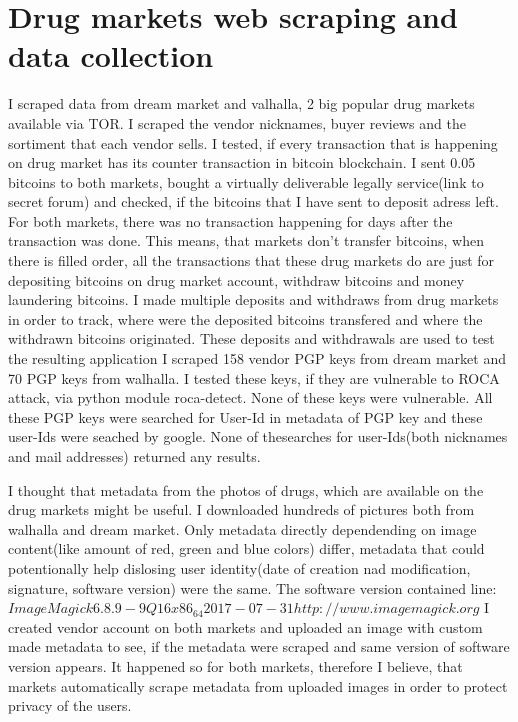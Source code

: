 \documentclass[
  digital, %
  table,   %
  lof,     %
  lot,     %
  oneside
]{fithesis3}
\begin{document}
\section{Drug markets web scraping and data collection}
I scraped data from dream market and valhalla, 2 big popular drug markets available via TOR. I scraped the vendor nicknames, buyer reviews and the sortiment that each vendor sells.
I tested, if every transaction that is happening on drug market has its counter transaction in bitcoin blockchain. I sent 0.05 bitcoins to both markets,
bought a virtually deliverable legally service(link to secret forum) and checked, if the bitcoins that I have sent to deposit adress left.
For both markets, there was no transaction happening for days after the transaction was done. This means, that markets don't transfer bitcoins,
when there is filled order, all the transactions that these drug markets do are just for depositing bitcoins on drug market account,
withdraw bitcoins and money laundering bitcoins.
I made multiple deposits and withdraws from drug markets in order to track, where were the deposited bitcoins transfered and where the withdrawn bitcoins originated.
These deposits and withdrawals are used to test the resulting application
I scraped 158 vendor PGP keys from dream market and 70 PGP keys from walhalla. I tested these keys, if they are vulnerable to ROCA attack, via python module roca-detect. None of these keys were vulnerable.
All these PGP keys were searched for User-Id in metadata of PGP key and these user-Ids were seached by google. None of thesearches for user-Ids(both nicknames and mail addresses) returned any results.

I thought that metadata from the photos of drugs, which are available on the drug markets might be useful.
I downloaded hundreds of pictures both from walhalla and dream market.
Only metadata directly dependending on image content(like amount of red, green and blue colors) differ,
metadata that could potentionally help dislosing user identity(date of creation nad modification, signature, software version) were the same.
The software version contained line: $ImageMagick 6.8.9-9 Q16 x86_64 2017-07-31 http://www.imagemagick.org$
I created vendor account on both markets and uploaded an image with custom made metadata to see,
if the metadata were scraped and same version of software version appears. It happened so for both markets,
therefore I believe, that markets automatically scrape metadata from uploaded images in order to protect privacy of the users.
\end{document}
